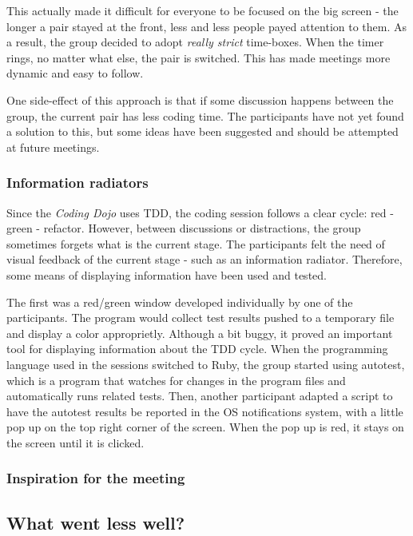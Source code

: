 This actually made it difficult for everyone to be focused on the big
screen - the longer a pair stayed at the front, less and less people
payed attention to them. As a result, the group decided to adopt
\textsl{really strict} time-boxes. When the timer rings, no matter
what else, the pair is switched. This has made meetings more dynamic
and easy to follow.

One side-effect of this approach is that if some discussion happens
between the group, the current pair has less coding time. The
participants have not yet found a solution to this, but some ideas
have been suggested and should be attempted at future meetings.

\subsubsection{Information radiators}

Since the \emph{Coding Dojo} uses TDD, the coding session follows a
clear cycle: red - green - refactor. However, between discussions or
distractions, the group sometimes forgets what is the current
stage. The participants felt the need of visual feedback of the
current stage - such as an information radiator. Therefore, some means
of displaying information have been used and tested.

The first was a red/green window developed individually by one of the
participants. The program would collect test results pushed to a
temporary file and display a color approprietly. Although a bit buggy,
it proved an important tool for displaying information about the TDD
cycle. When the programming language used in the sessions switched to
Ruby, the group started using autotest, which is a program that
watches for changes in the program files and automatically runs
related tests. Then, another participant adapted a script to have the
autotest results be reported in the OS notifications system, with a
little pop up on the top right corner of the screen. When the pop up
is red, it stays on the screen until it is clicked. 

\subsubsection{Inspiration for the meeting}

\subsection{What went less well?}\label{ssub:less_well}

